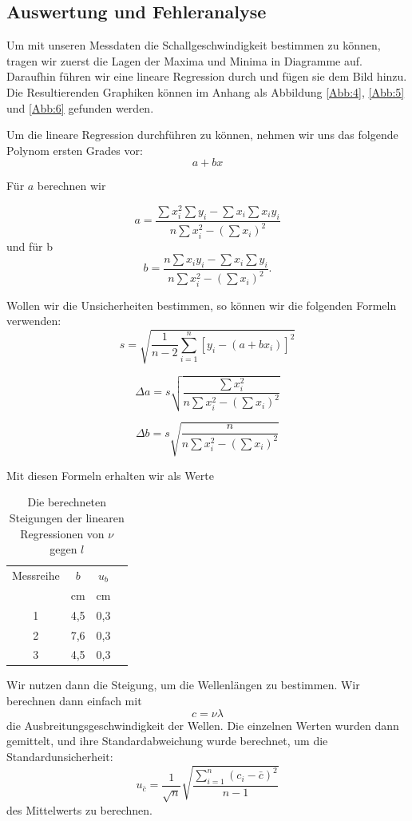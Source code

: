 \documentclass[11pt,a4paper]{article}
\begin{document}
\subsection{Auswertung und Fehleranalyse}

Um mit unseren Messdaten die Schallgeschwindigkeit bestimmen zu k\"onnen, tragen wir zuerst die Lagen der Maxima und Minima in Diagramme auf. Daraufhin f\"uhren wir eine lineare Regression durch und f\"ugen sie dem Bild hinzu. Die Resultierenden Graphiken k\"onnen im Anhang als Abbildung \ref{Abb:4}, \ref{Abb:5} und \ref{Abb:6} gefunden werden.

Um die lineare Regression durchf\"uhren zu k\"onnen, nehmen wir uns das folgende Polynom ersten Grades vor:
\[ a+bx\]

F\"ur $a$ berechnen wir

\[a=\frac{\sum x_i^2\sum y_i-\sum x_i\sum x_iy_i}{n\sum x_i^2-(\sum x_i)^2}\]
und f\"ur b
\[b=\frac{n\sum x_iy_i-\sum x_i\sum y_i}{n\sum x_i^2-(\sum x_i)^2}.\]

Wollen wir die Unsicherheiten bestimmen, so k\"onnen wir die folgenden Formeln verwenden:
\[
s=\sqrt{\frac{1}{n-2}\sum^n_{i=1}[y_i-(a+bx_i)]^2}\]

\[\Delta a=s\sqrt{\frac{\sum x_i^2}{n\sum x_i^2-(\sum x_i)^2}}\]

\[\Delta b=s\sqrt{\frac{n}{n\sum x_i^2-(\sum x_i)^2}}\]

Mit diesen Formeln erhalten wir als Werte

\begin{table}[h]
	\centering
	\begin{tabular*}{0.50\textwidth}{@{\extracolsep{\fill}}cccc}
		\toprule
		Messreihe & $b$ & $u_b$ \\
		& cm & cm\\
		1 & 4,5 & 0,3\\
		2 & 7,6 & 0,3\\
		3 & 4,5 & 0,3\\
		\bottomrule
	\end{tabular*}
\caption{Die berechneten Steigungen der linearen Regressionen von $\nu$ gegen $l$}
\label{Table1}
\end{table}

Wir nutzen dann die Steigung, um die Wellenl\"angen zu bestimmen. Wir berechnen dann einfach mit
\begin{equation}
c=\nu\lambda
\end{equation}
die Ausbreitungsgeschwindigkeit der Wellen.
Die einzelnen Werten wurden dann gemittelt, und ihre Standardabweichung wurde berechnet, um die Standardunsicherheit:
$$u_{\bar{c}} = \frac{1}{\sqrt{n}} \sqrt{\frac{\sum_{i=1}^{n}(c_i-\bar{c})^2}{n-1}}$$
des Mittelwerts zu berechnen. 
 
\end{document}
